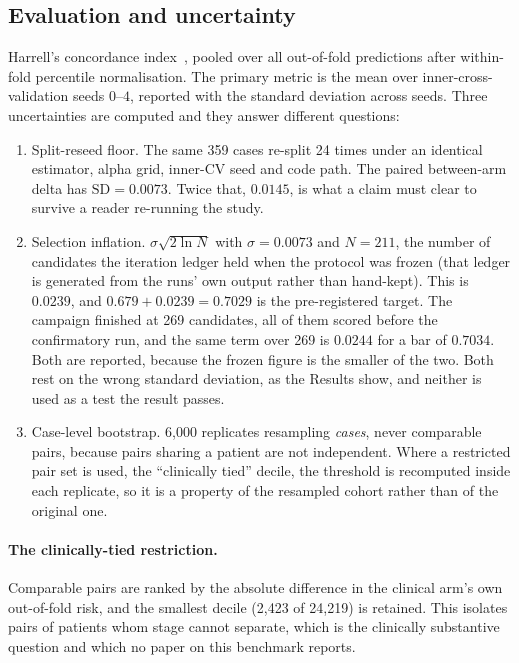 \documentclass[unnumsec,webpdf,contemporary,large]{oup-authoring-template}
\begin{document}
\subsection{Evaluation and uncertainty}

Harrell's concordance index~\citep{harrell1982cindex}, pooled over all out-of-fold predictions after
within-fold percentile normalisation. The primary metric is the mean over inner-cross-validation
seeds $0$--$4$, reported with the standard deviation across seeds. Three uncertainties are computed
and they answer different questions:

\begin{enumerate}
  \item Split-reseed floor. The same 359 cases re-split 24 times under an identical
    estimator, alpha grid, inner-CV seed and code path. The paired between-arm delta has
    $\mathrm{SD}=0.0073$. Twice that, $0.0145$, is what a claim must clear to survive a reader
    re-running the study.
  \item Selection inflation. $\sigma\sqrt{2\ln N}$ with $\sigma=0.0073$ and $N=211$, the
    number of candidates the iteration ledger held when the protocol was frozen (that ledger is
    generated from the runs' own output rather than hand-kept). This is $0.0239$, and
    $0.679+0.0239=0.7029$ is the pre-registered target. The campaign finished at 269 candidates,
    all of them scored before the confirmatory run, and the same term over 269 is $0.0244$ for a
    bar of $0.7034$. Both are reported, because the frozen figure is the smaller of the two.
    Both rest on the wrong standard deviation, as the Results show, and neither is used as a test
    the result passes.
  \item Case-level bootstrap. 6{,}000 replicates resampling \emph{cases}, never comparable
    pairs, because pairs sharing a patient are not independent. Where a restricted pair set is used, the ``clinically tied'' decile, the threshold is recomputed inside each replicate, so it
    is a property of the resampled cohort rather than of the original one.
\end{enumerate}

\paragraph{The clinically-tied restriction.} Comparable pairs are ranked by the absolute difference
in the clinical arm's own out-of-fold risk, and the smallest decile (2{,}423 of 24{,}219) is
retained. This isolates pairs of patients whom stage cannot separate, which is the clinically
substantive question and which no paper on this benchmark reports.
\end{document}
